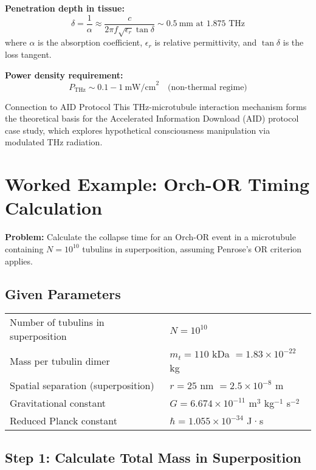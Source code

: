 \textbf{Penetration depth in tissue:}
\begin{equation}
\label{eq:penetration-depth}
\delta = \frac{1}{\alpha} \approx \frac{c}{2\pi f \sqrt{\epsilon_r} \tan\delta} \sim 0.5~\text{mm at 1.875 THz}
\end{equation}
where $\alpha$ is the absorption coefficient, $\epsilon_r$ is relative permittivity, and $\tan\delta$ is the loss tangent.

\textbf{Power density requirement:}
\begin{equation}
\label{eq:power-density}
P_{\text{THz}} \sim 0.1-1~\text{mW/cm}^2 \quad \text{(non-thermal regime)}
\end{equation}

\begin{calloutbox}{Connection to AID Protocol}
This THz-microtubule interaction mechanism forms the theoretical basis for the Accelerated Information Download (AID) protocol case study, which explores hypothetical consciousness manipulation via modulated THz radiation.
\end{calloutbox}

\section{Worked Example: Orch-OR Timing Calculation}

\textbf{Problem:} Calculate the collapse time for an Orch-OR event in a microtubule containing $N = 10^{10}$ tubulins in superposition, assuming Penrose's OR criterion applies.

\subsection*{Given Parameters}

\begin{tabular}{@{}ll@{}}
Number of tubulins in superposition & $N = 10^{10}$ \\
Mass per tubulin dimer & $m_t = 110$ kDa $= 1.83 \times 10^{-22}$ kg \\
Spatial separation (superposition) & $r = 25$ nm $= 2.5 \times 10^{-8}$ m \\
Gravitational constant & $G = 6.674 \times 10^{-11}$ m$^3$ kg$^{-1}$ s$^{-2}$ \\
Reduced Planck constant & $\hbar = 1.055 \times 10^{-34}$ J·s \\
\end{tabular}

\subsection*{Step 1: Calculate Total Mass in Superposition}

